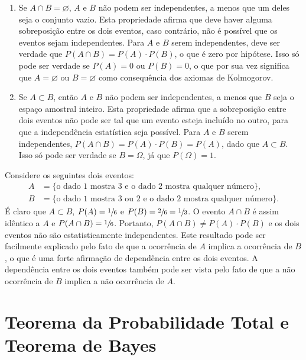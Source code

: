 \begin{enumerate}[noitemsep]
\item Se $A \cap B = \varnothing$, $A$ e $B$ não podem ser independentes, a menos que um deles seja o conjunto vazio. Esta propriedade afirma que deve haver alguma sobreposição entre os dois eventos, caso contrário, não é possível que os eventos sejam independentes. Para $A$ e $B$ serem independentes, deve ser verdade que $P(A \cap B) = P(A) \cdot P(B)$, o que é zero por hipótese. Isso só pode ser verdade se $P(A) = 0$ ou $P(B) = 0$, o que por sua vez significa que $A = \varnothing$ ou $B = \varnothing$ como consequência dos axiomas de Kolmogorov.

\item Se $A \subset B$, então $A$ e $B$ não podem ser independentes, a menos que $B$ seja o espaço amostral inteiro. Esta propriedade afirma que a sobreposição entre dois eventos não pode ser tal que um evento esteja incluído no outro, para que a independência estatística seja possível. Para $A$ e $B$ serem independentes, $P(A \cap B) = P(A) \cdot P(B) = P(A)$, dado que $A \subset B$. Isso só pode ser verdade se $B = \Omega$, já que $P(\Omega) = 1$.
\end{enumerate}

\begin{exemplo}{}{}
Considere os seguintes dois eventos:
\begin{align*}
	A &= \{ \text{o dado 1 mostra 3 e o dado 2 mostra qualquer número} \},  \\
	B &=  \{ \text{o dado 1 mostra 3 ou 2 e o dado 2 mostra qualquer número} \}.
\end{align*}
É claro que $A \subset B$, $P(A) = \sfrac{1}{6}$ e $P(B) = \sfrac{2}{6} = \sfrac{1}{3}$. O evento $A \cap B$ é assim idêntico a $A$ e $P(A \cap B) = \sfrac{1}{6}$. Portanto, $P(A \cap B) \neq P(A) \cdot P(B)$ e os dois eventos não são estatisticamente independentes. Este resultado pode ser facilmente explicado pelo fato de que a ocorrência de $A$ implica a ocorrência de $B$, o que é uma forte afirmação de dependência entre os dois eventos. A dependência entre os dois eventos também pode ser vista pelo fato de que a não ocorrência de $B$ implica a não ocorrência de $A$. 
\end{exemplo}

\section{Teorema da Probabilidade Total e Teorema de Bayes}

